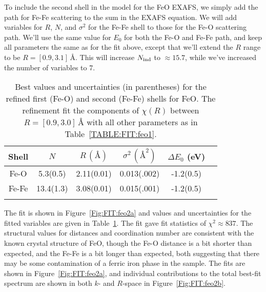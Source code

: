 To include the second shell in the model for the FeO EXAFS, we simply add
the path for Fe-Fe scattering to the sum in the EXAFS equation.  We will
add variables for $R$, $N$, and $\sigma^2$ for the Fe-Fe shell to those for
the Fe-O scattering path.  We'll use the same value for $E_0$ for both the
Fe-O and Fe-Fe path, and keep all parameters the same as for the fit above,
except that we'll extend the $R$ range to be $R=[0.9, 3.1]\,\text{\AA}$.
This will increase $N_{\rm ind}$ to $\approx 15.7$, while we've increased
the number of variables to 7.

\begin{table}[bh]
  \caption{Best values and uncertainties (in parentheses) for the
    refined first (Fe-O) and second (Fe-Fe) shells  for FeO.  The refinement fit the
    components of $\chi(R)$ between $R=[0.9, 3.0]\,\text{\AA}$ with all other
    parameters as in Table~\ref{TABLE:FIT:feo1}.}
  \label{TABLE:FIT:feo2}
  \begin{center}
    \begin{tabular}{cccccc}
    Shell & ${N}$ & ${R}\, (\text{\AA})$ & $\sigma^2\, (\text{\AA}^2)$ & ${\Delta E_0}$ (eV) \\
    \hline    \noalign{\smallskip}
    Fe-O   &   5.3(0.5)  &   2.11(0.01) & 0.013(.002) & -1.2(0.5)\\
    Fe-Fe  &  13.4(1.3) & 3.08(0.01) & 0.015(.001) &  -1.2(0.5)\\
    \noalign{\smallskip}
    \hline
  \end{tabular}
\end{center}
\end{table}


The fit is shown in Figure~\ref{Fig:FIT:feo2a} and values and uncertainties
for the fitted variables are given in Table~\ref{TABLE:FIT:feo2}.  The fit
gave fit statistics of $\chi^2 \approx 837$.  The structural values for
distances and coordination number are consistent with the known crystal
structure of FeO, though the Fe-O distance is a bit shorter than expected,
and the Fe-Fe is a bit longer than expected, both suggesting that there may
be some contamination of a ferric iron phase in the sample.  The fits are
shown in Figure~\ref{Fig:FIT:feo2a}, and individual contributions to the total
best-fit spectrum are shown in both $k$- and $R$-space in
Figure~\ref{Fig:FIT:feo2b}.


